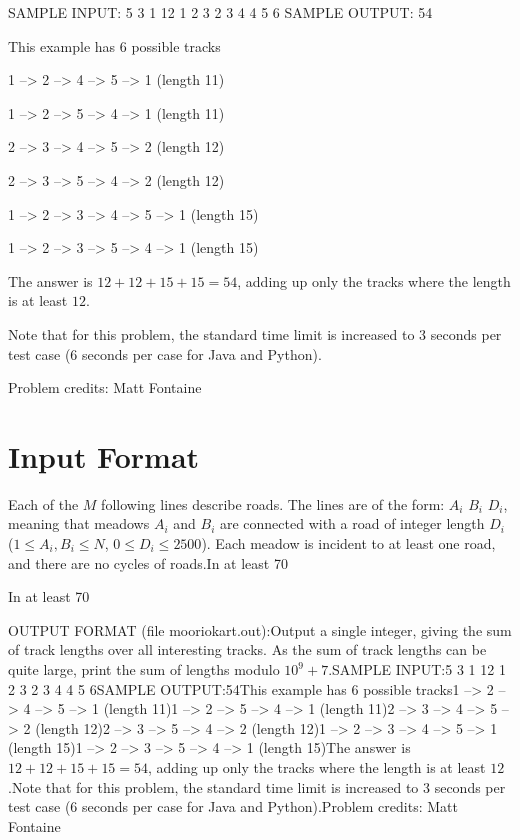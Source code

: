 \documentclass[12pt]{article}
\begin{document}
SAMPLE INPUT:
5 3 1 12
1 2 3
2 3 4
4 5 6
SAMPLE OUTPUT: 
54

This example has 6 possible tracks

1 --> 2 --> 4 --> 5 --> 1         (length 11)

1 --> 2 --> 5 --> 4 --> 1         (length 11)

2 --> 3 --> 4 --> 5 --> 2         (length 12)

2 --> 3 --> 5 --> 4 --> 2         (length 12)

1 --> 2 --> 3 --> 4 --> 5 --> 1   (length 15)

1 --> 2 --> 3 --> 5 --> 4 --> 1   (length 15)

The answer is $12+12+15+15=54$, adding up only the tracks where the length is at
least $12$.

Note that for this problem, the standard time limit is increased to 3 seconds
per test case (6 seconds per case for Java and Python).


Problem credits: Matt Fontaine



\section*{Input Format}
Each of the $M$ following lines describe roads. The lines are of the form: $A_i$
$B_i$ $D_i$, meaning that meadows $A_i$ and $B_i$ are connected with a road of
integer length $D_i$ ($1 \leq A_i, B_i \leq N$, $0 \leq D_i \leq 2500$).  Each
meadow is incident to at least one road, and there are no cycles of roads.In at least 70%

In at least 70%

OUTPUT FORMAT (file mooriokart.out):Output a single integer, giving the sum of track lengths over all interesting
tracks. As the sum of track lengths can be quite large, print the sum of lengths
modulo
$10^9+7$.SAMPLE INPUT:5 3 1 12
1 2 3
2 3 4
4 5 6SAMPLE OUTPUT:54This example has 6 possible tracks1 --> 2 --> 4 --> 5 --> 1         (length 11)1 --> 2 --> 5 --> 4 --> 1         (length 11)2 --> 3 --> 4 --> 5 --> 2         (length 12)2 --> 3 --> 5 --> 4 --> 2         (length 12)1 --> 2 --> 3 --> 4 --> 5 --> 1   (length 15)1 --> 2 --> 3 --> 5 --> 4 --> 1   (length 15)The answer is $12+12+15+15=54$, adding up only the tracks where the length is at
least $12$.Note that for this problem, the standard time limit is increased to 3 seconds
per test case (6 seconds per case for Java and Python).Problem credits: Matt Fontaine
\end{document}
